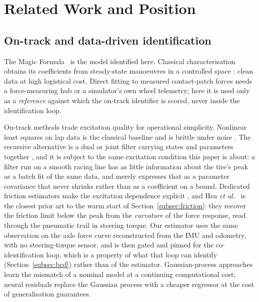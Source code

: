 \section{Related Work and Position}
\label{sec:related}

\subsection{On-track and data-driven identification}

The Magic Formula~\cite{pacejka1987sae,pacejka2012book} is the model identified
here. Classical characterisation obtains its coefficients from steady-state
manoeuvres in a controlled space \cite{ontrack2025,amz2020}: clean data at high
logistical cost. Direct fitting to measured contact-patch forces needs a
force-measuring hub or a simulator's own wheel telemetry; here it is used only
as a \emph{reference} against which the on-track identifier is scored, never
inside the identification loop.

On-track methods trade excitation quality for operational simplicity. Nonlinear
least squares on lap data is the classical baseline and is brittle under noise
\cite{ontrack2025}. The recursive alternative is a dual or joint filter carrying
states and parameters together \cite{wenzel2006dekf,sierra2006cornering}, and it
is subject to the same excitation condition this paper is about: a filter run on
a smooth racing line has as little information about the tire's peak as a batch
fit of the same data, and merely expresses that as a parameter covariance that
never shrinks rather than as a coefficient on a bound. Dedicated friction
estimators make the excitation dependence explicit
\cite{rajamani2012wheelfriction,ahn2013friction,acosta2017friction,khaleghian2017survey},
and Hsu \emph{et al.}~\cite{hsu2010trail} is the closest prior art to the warm
start of Section~\ref{subsec:friction}: they recover the friction limit below
the peak from the \emph{curvature} of the force response, read through the
pneumatic trail in steering torque. Our estimator uses the same observation on
the axle force curve reconstructed from the IMU and odometry, with no
steering-torque sensor, and is then gated and pinned for the co-identification
loop, which is a property of what that loop can identify
(Section~\ref{subsec:bcd}) rather than of the estimator.
Gaussian-process approaches learn the mismatch of a nominal
model \cite{hewing2018cautious,hewing2020cautious,kabzan2019lbmpc} at a
continuing computational cost; neural residuals replace the Gaussian process
with a cheaper regressor at the cost of generalisation guarantees.

